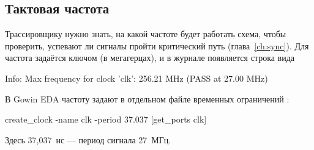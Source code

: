 \subsection{Тактовая частота}

Трассировщику нужно знать, на какой частоте будет работать схема, чтобы
проверить, успевают ли сигналы пройти критический путь
(глава~\ref{ch:sync}). Для  частота задаётся ключом
 (в мегагерцах), и в журнале появляется строка вида
\begin{vcode}[text]
Info: Max frequency for clock 'clk': 256.21 MHz (PASS at 27.00 MHz)
\end{vcode}
В Gowin EDA частоту задают в отдельном файле временных ограничений :
\begin{vcode}[text]
create_clock -name clk -period 37.037 [get_ports {clk}]
\end{vcode}
Здесь 37,037~нс --- период сигнала 27~МГц.
